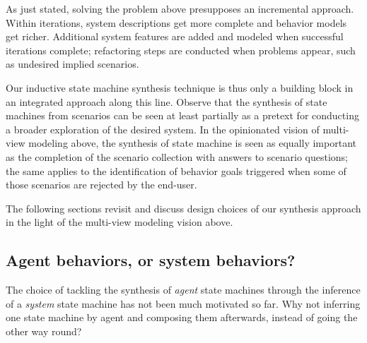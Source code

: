 As just stated, solving the problem above presupposes an incremental approach. Within iterations, system descriptions get more complete and behavior models get richer. Additional system features are added and modeled when successful iterations complete; refactoring steps are conducted when problems appear, such as undesired implied scenarios.

Our inductive state machine synthesis technique is thus only a building block in an integrated approach along this line. Observe that the synthesis of state machines from scenarios can be seen at least partially as a pretext for conducting a broader exploration of the desired system. In the opinionated vision of multi-view modeling above, the synthesis of state machine is seen as equally important as the completion of the scenario collection with answers to scenario questions; the same applies to the identification of behavior goals triggered when some of those scenarios are rejected by the end-user.

The following sections revisit and discuss design choices of our synthesis approach in the light of the multi-view modeling vision above.

\subsection{Agent behaviors, or system behaviors?}

The choice of tackling the synthesis of \emph{agent} state machines through the inference of a \emph{system} state machine has not been much motivated so far. Why not inferring one state machine by agent and composing them afterwards, instead of going the other way round?

